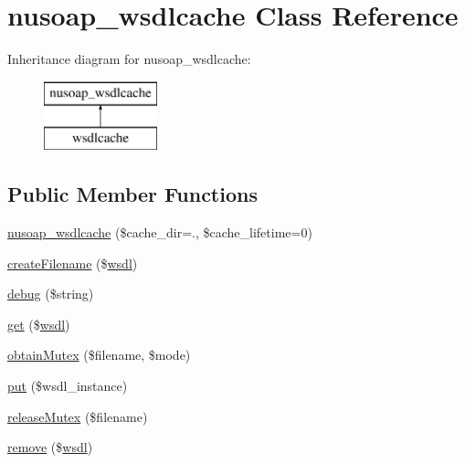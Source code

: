 \hypertarget{classnusoap__wsdlcache}{}\section{nusoap\+\_\+wsdlcache Class Reference}
\label{classnusoap__wsdlcache}
Inheritance diagram for nusoap\+\_\+wsdlcache\+:\begin{figure}[H]
\begin{center}
\leavevmode
\includegraphics[height=2.000000cm]{classnusoap__wsdlcache}
\end{center}
\end{figure}
\subsection*{Public Member Functions}
\begin{DoxyCompactItemize}
\item 
\hyperlink{classnusoap__wsdlcache_a466e86160e07ec88694c673e26caa94d}{nusoap\+\_\+wsdlcache} (\$cache\+\_\+dir=\textquotesingle{}.\textquotesingle{}, \$cache\+\_\+lifetime=0)
\item 
\hyperlink{classnusoap__wsdlcache_a6251fc73486e49b3ad8452c3cff4f4df}{create\+Filename} (\$\hyperlink{classwsdl}{wsdl})
\item 
\hyperlink{classnusoap__wsdlcache_ac652bd9010bd39b0f2854f7ded3f6f33}{debug} (\$string)
\item 
\hyperlink{classnusoap__wsdlcache_a95483fbc06ab50e4e5720ec16065b4f5}{get} (\$\hyperlink{classwsdl}{wsdl})
\item 
\hyperlink{classnusoap__wsdlcache_a0ad0130e7028ed6b671ecdf4491dc7a2}{obtain\+Mutex} (\$filename, \$mode)
\item 
\hyperlink{classnusoap__wsdlcache_a797ff61a54a3f50e9cb8c974cacc1bb8}{put} (\$wsdl\+\_\+instance)
\item 
\hyperlink{classnusoap__wsdlcache_a424545075e6a286d26453c500ecaa26d}{release\+Mutex} (\$filename)
\item 
\hyperlink{classnusoap__wsdlcache_ad6672e5263a78393605bc28e80d25902}{remove} (\$\hyperlink{classwsdl}{wsdl})
\end{DoxyCompactItemize}
